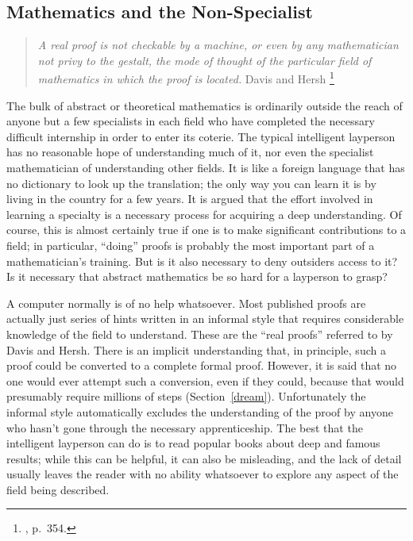 \subsection{Mathematics and the Non-Specialist}

\begin{quote}
  {\em A real proof is not checkable by a machine, or even by any mathematician
not privy to the gestalt, the mode of thought of the particular field of
mathematics in which the proof is located.}
  \flushright\sc  Davis and Hersh
  \footnote{\cite{Davis}, p.~354.}\\
\end{quote}

The bulk of abstract or theoretical mathematics is ordinarily outside
the reach of anyone but a few specialists in each field who have completed
the necessary difficult internship in order to enter its coterie.  The
typical intelligent layperson has no reasonable hope of understanding much of
it, nor even the specialist mathematician of understanding other fields.  It
is like a foreign language that has no dictionary to look up the translation;
the only way you can learn it is by living in the country for a few years.  It
is argued that the effort involved in learning a specialty is a necessary
process for acquiring a deep understanding.  Of course, this is almost certainly
true if one is to make significant contributions to a field; in particular,
``doing'' proofs is probably the most important part of a mathematician's
training.  But is it also necessary to deny outsiders access to it?  Is it
necessary that abstract mathematics be so hard for a layperson to grasp?

A computer normally is of no help whatsoever.  Most published proofs are
actually just series of hints written in an informal style that requires
considerable knowledge of the field to understand.  These are the ``real
proofs'' referred to by Davis and Hersh.  There is an
implicit understanding that, in principle, such a proof could be converted to
a complete formal proof.  However, it is said that no one
would ever attempt such a conversion, even if they could, because that would
presumably require millions of steps (Section~\ref{dream}).  Unfortunately the
informal style automatically excludes the understanding of the proof
by anyone who hasn't gone through the necessary apprenticeship. The
best that the intelligent layperson can do is to read popular books about deep
and famous results; while this can be helpful, it can also be misleading, and
the lack of detail usually leaves the reader with no ability whatsoever to
explore any aspect of the field being described.

